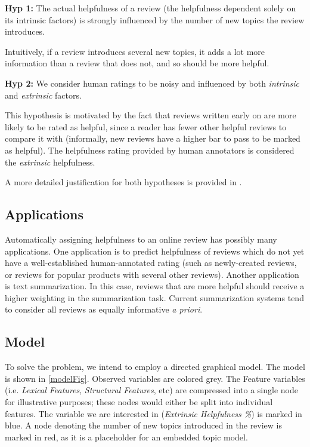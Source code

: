 \documentclass[12pt,letterpaper]{article}
\begin{document}
{\bf Hyp 1:}  The actual helpfulness of a review (the helpfulness dependent solely on its intrinsic factors) is strongly influenced by the number of new topics the review introduces.

Intuitively, if a review introduces several new topics, it adds a lot more information than a review that does not, and so should be more helpful. 

{\bf Hyp 2:} We consider human ratings to be noisy and influenced by both {\em intrinsic} and {\em extrinsic} factors.

This hypothesis is motivated by the fact that reviews written early on are more likely to be rated as helpful, since a reader has fewer other helpful reviews to compare it with (informally, new reviews have a higher bar to pass to be marked as helpful).
The helpfulness rating provided by human annotators is considered the {\em extrinsic} helpfulness.

A more detailed justification for both hypotheses  is provided in .

\subsection{Applications}
Automatically assigning helpfulness to an online review has possibly many applications. One application is to predict helpfulness of reviews which do not yet have a well-established human-annotated rating (such as newly-created reviews, or reviews for popular products with several other reviews).  Another application is text summarization. In this case, reviews that are more helpful should receive a higher weighting in the summarization task. Current summarization systems tend to consider all reviews as  equally informative {\em a priori}.

\subsection{Model}
To solve the problem, we intend to employ a directed graphical model.
The model is shown in \ref{modelFig}.
Observed variables are colored grey. 
The Feature variables (i.e. {\em Lexical Features}, {\em Structural Features}, 
	etc) are compressed into a single node for illustrative purposes;
	these nodes would either be split into individual features.
The variable we are interested in ({\em Extrinsic Helpfulness \%}) is marked
	in blue.
A node denoting the number of new topics introduced in the review is marked
	in red, as it is a placeholder for an embedded topic model.
\end{document}
